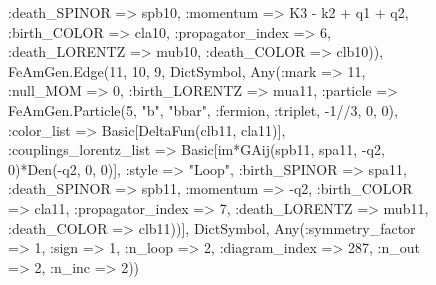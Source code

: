\documentclass{revtex4}
\begin{document}
\begin{figure}[!htb]
\begin{center}
{:death_SPINOR => spb10, :momentum => K3 - k2 + q1 + q2, :birth_COLOR => cla10, :propagator_index => 6, :death_LORENTZ => mub10, :death_COLOR => clb10)), FeAmGen.Edge(11, 10, 9, Dict{Symbol, Any}(:mark => 11, :null_MOM => 0, :birth_LORENTZ => mua11, :particle => FeAmGen.Particle(5, "b", "bbar", :fermion, :triplet, -1//3, 0, 0), :color_list => Basic[DeltaFun(clb11, cla11)], :couplings_lorentz_list => Basic[im*GAij(spb11, spa11, -q2, 0)*Den(-q2, 0, 0)], :style => "Loop", :birth_SPINOR => spa11, :death_SPINOR => spb11, :momentum => -q2, :birth_COLOR => cla11, :propagator_index => 7, :death_LORENTZ => mub11, :death_COLOR => clb11))], Dict{Symbol, Any}(:symmetry_factor => 1, :sign => 1, :n_loop => 2, :diagram_index => 287, :n_out => 2, :n_inc => 2)) 
}
\end{center}
\end{figure}
\end{document}
